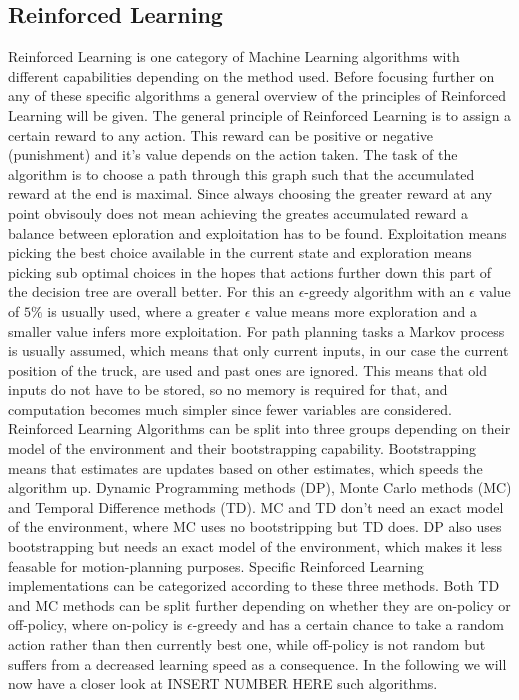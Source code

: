 \subsection{Reinforced Learning}
\label{sec:reinforced_learning}

Reinforced Learning is one category of Machine Learning algorithms with different capabilities depending on the method used. Before focusing further on any of these specific algorithms a general overview of the principles of Reinforced Learning will be given. The general principle of Reinforced Learning is to assign a certain reward to any action. This reward can be positive or negative (punishment) and it's value depends on the action taken. The task of the algorithm is to choose a path through this graph such that the accumulated reward at the end is maximal. Since always choosing the greater reward at any point obvisouly does not mean achieving the greates accumulated reward a balance between eploration and exploitation has to be found. Exploitation means picking the best choice available in the current state and exploration means picking sub optimal choices in the hopes that actions further down this part of the decision tree are overall better. For this an $\epsilon$-greedy algorithm with an $\epsilon$ value of $5\%$ is usually used, where a greater $\epsilon$ value means more exploration and a smaller value infers more exploitation. For path planning tasks a Markov process is usually assumed, which means that only current inputs, in our case the current position of the truck, are used and past ones are ignored. This means that old inputs do not have to be stored, so no memory is required for that, and computation becomes much simpler since fewer variables are considered. Reinforced Learning Algorithms can be split into three groups depending on their model of the environment and their bootstrapping capability. Bootstrapping means that estimates are updates based on other estimates, which speeds the algorithm up. Dynamic Programming methods (DP), Monte Carlo methods (MC) and Temporal Difference methods (TD). MC and TD don't need an exact model of the environment, where MC uses no bootstripping but TD does. DP also uses bootstrapping but needs an exact model of the environment, which makes it less feasable for motion-planning purposes.\cite{9} Specific Reinforced Learning implementations can be categorized according to these three methods. Both TD and MC methods can be split further depending on whether they are on-policy or off-policy, where on-policy is $\epsilon$-greedy and has a certain chance to take a random action rather than then currently best one, while off-policy is not random but suffers from a decreased learning speed as a consequence. In the following we will now have a closer look at INSERT NUMBER HERE such algorithms.

